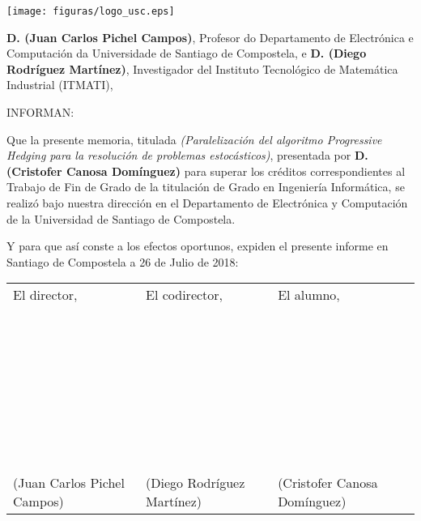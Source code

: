 \pagestyle{plain}
\texttt{[image: figuras/logo\_usc.eps]}

\vspace{1cm}
{\bf D. (Juan Carlos Pichel Campos)}, Profesor do Departamento de Electrónica e Computación da Universidade de Santiago de Compostela, e {\bf D. (Diego Rodríguez Martínez)}, Investigador del Instituto Tecnológico de Matemática Industrial (ITMATI),

\vspace{1cm}
INFORMAN:

\vspace{1cm}
Que la presente memoria, titulada {\it (Paralelización del algoritmo Progressive Hedging para la resolución de problemas estocásticos)}, presentada por {\bf D. (Cristofer Canosa Domínguez)} para superar los créditos correspondientes al Trabajo de Fin de Grado de la titulación de Grado en Ingeniería Informática, se realizó bajo nuestra dirección en el Departamento de Electrónica y Computación de la Universidad de Santiago de Compostela.

\vspace{1cm}
Y para que así conste a los efectos oportunos, expiden el presente informe en Santiago de Compostela a 26 de Julio de 2018:

\vspace{2cm}
\begin{tabular}{lll}
El director, & El codirector, & El alumno, \\
~ \\
~ \\
~ \\
~ \\
~ \\
~ \\
~ \\
(Juan Carlos Pichel Campos) & (Diego Rodríguez Martínez) & (Cristofer Canosa Domínguez)
\end{tabular}

